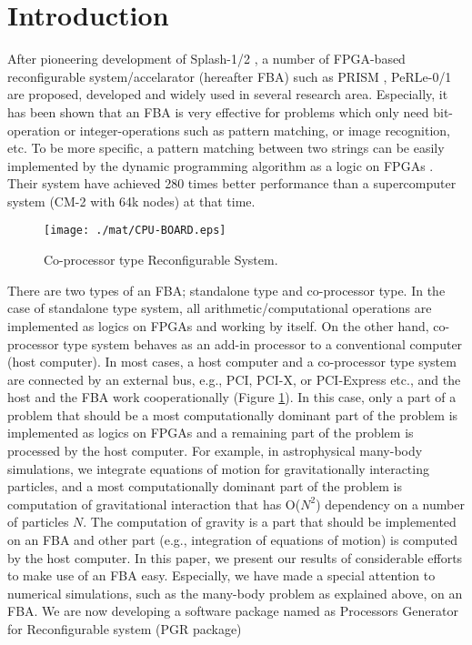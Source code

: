 \documentclass[times, 10pt,twocolumn]{article}
\begin{document}
\section{Introduction}
After pioneering development of Splash-1/2 \cite{Splash},
a number of FPGA-based reconfigurable system/accelarator (hereafter FBA)
such as PRISM \cite{W93}, PeRLe-0/1 \cite{BT94}
are proposed, developed and widely used in several research area.
Especially, it has been shown that an FBA is very effective for
problems which only need bit-operation or integer-operations
such as pattern matching, or image recognition, etc.
To be more specific, a pattern matching between two strings
can be easily implemented by the dynamic programming algorithm \cite{DP}
as a logic on FPGAs \cite{Splash}.
Their system have achieved 280 times better performance than
a supercomputer system (CM-2 with 64k nodes) at that time.

\begin{figure}[htb]
\begin{center}
\texttt{[image: ./mat/CPU-BOARD.eps]}
\caption{Co-processor type Reconfigurable System.}
\label{CPU-BOARD}
\end{center}
\end{figure}

There are two types of an FBA; standalone type and co-processor type.
In the case of standalone type system, all arithmetic/computational operations
are implemented as logics on FPGAs and working by itself.
On the other hand, co-processor type system behaves as an add-in processor 
to a conventional computer (host computer).
In most cases, a host computer and a co-processor type system 
are connected by an external bus, e.g., PCI, PCI-X, or PCI-Express etc., 
and the host and the FBA work cooperationally (Figure \ref{CPU-BOARD}).
In this case, only a part of a problem
that should be a most computationally dominant part of the problem
is implemented as logics on FPGAs and
a remaining part of the problem is processed by the host computer.
For example, in astrophysical many-body simulations, 
we integrate equations of motion for gravitationally interacting particles,
and a most computationally dominant part of the problem is 
computation of gravitational interaction that has O($N^2$) dependency
on a number of particles $N$.
The computation of gravity is a part that should be implemented on 
an FBA and other part (e.g., integration of equations of motion)
is computed by the host computer.
In this paper, we present our results of considerable efforts
to make use of an FBA easy.
Especially, we have made a special attention to numerical simulations, 
such as the many-body problem as explained above, on an FBA.
We are now developing a software package named as
Processors Generator for Reconfigurable system (PGR package)
\end{document}
